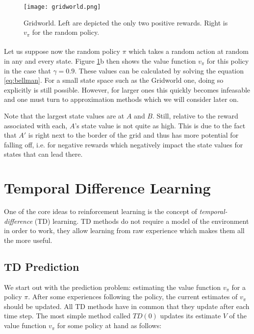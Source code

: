 \begin{figure}[htpb]
  \centering
  \texttt{[image: gridworld.png]}
  \caption[Gridworld]{
    Gridworld.
    Left are depicted the only two positive rewards.
    Right is $v_\pi$ for the random policy.
    \parencite{Sutton1998a}
  }
  \label{fig:gridworld}
\end{figure}

\paragraph{}
Let us suppose now the random policy $\pi$
which takes a random action at random in any and every state.
Figure \ref{fig:gridworld}b then shows the value function $v_\pi$
for this policy in the case that $\gamma=0.9$.
These values can be calculated by solving the equation \ref{eq:bellman}.
For a small state space such as the Gridworld one, doing so explicitly
is still possible.
However, for larger ones this quickly becomes infeasable
and one must turn to approximation methods
which we will consider later on.

Note that the largest state values are at $A$ and $B$.
Still, relative to the reward associated with each,
$A$'s state value is not quite as high.
This is due to the fact that $A'$
is right next to the border of the grid
and thus has more potential for falling off,
i.e. for negative rewards which negatively impact
the state values for states that can lead there.

\section{Temporal Difference Learning}

One of the core ideas to reinforcement learning
is the concept of \textit{temporal-difference} (TD) learning.
TD methods do not require a model of the environment
in order to work,
they allow learning from raw experience
which makes them all the more useful.

\subsection{TD Prediction}
We start out with the prediction problem:
estimating the value function $v_\pi$ for a policy $\pi$.
After some experiences following the policy,
the current estimates of $v_\pi$ should be updated.
All TD methods have in common that they update after each time step.
The most simple method called $TD(0)$
updates its estimate $V$ of the value function $v_\pi$
for some policy at hand as follows:

